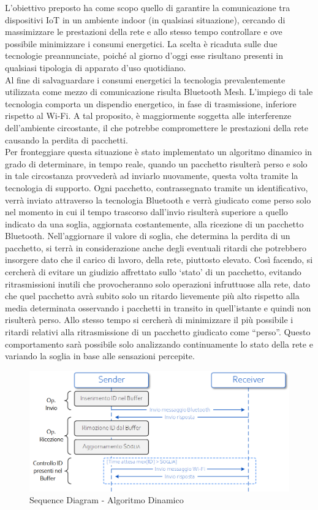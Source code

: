 \noindent L'obiettivo preposto ha come scopo quello di garantire la comunicazione tra dispositivi IoT in un ambiente indoor (in qualsiasi situazione), cercando di massimizzare le prestazioni della rete e allo stesso tempo controllare e ove possibile minimizzare i consumi energetici. La scelta è ricaduta sulle due tecnologie preannunciate, poiché al giorno d'oggi esse risultano presenti in qualsiasi tipologia di apparato d'uso quotidiano.\\
Al fine di salvaguardare i consumi energetici la tecnologia prevalentemente utilizzata come mezzo di comunicazione risulta Bluetooth Mesh. L'impiego di tale tecnologia comporta un dispendio energetico, in fase di trasmissione, inferiore rispetto al Wi-Fi. A tal proposito, è maggiormente soggetta alle interferenze dell'ambiente circostante, il che potrebbe compromettere le prestazioni della rete causando la perdita di pacchetti.\\
Per fronteggiare questa situazione è stato implementato un algoritmo dinamico in grado di determinare, in tempo reale, quando un pacchetto risulterà perso e solo in tale circostanza provvederà ad inviarlo nuovamente, questa volta tramite la tecnologia di supporto.
Ogni pacchetto, contrassegnato tramite un identificativo, verrà inviato attraverso la tecnologia Bluetooth e verrà giudicato come perso solo nel momento in cui il tempo trascorso dall'invio risulterà superiore a quello indicato da una soglia, aggiornata costantemente, alla ricezione di un pacchetto Bluetooth.
Nell'aggiornare il valore di soglia, che determina la perdita di un pacchetto, si terrà in considerazione anche degli eventuali ritardi che potrebbero insorgere dato che il carico di lavoro, della rete, piuttosto elevato. Così facendo, si cercherà di evitare un giudizio affrettato sullo `stato' di un pacchetto, evitando ritrasmissioni inutili che provocheranno solo operazioni infruttuose alla rete, dato che quel pacchetto avrà subito solo un ritardo lievemente più alto rispetto alla media determinata osservando i pacchetti in transito in quell'istante e quindi non risulterà perso. Allo stesso tempo si cercherà di minimizzare il più possibile i ritardi relativi alla ritrasmissione di un pacchetto giudicato come ``perso''. Questo comportamento sarà possibile solo analizzando continuamente lo stato della rete e variando la soglia in base alle sensazioni percepite.

\begin{figure}[!ht]
    \centering
    \includegraphics[width = \textwidth]{images/algoritmo_sequence.png}
    \caption{Sequence Diagram - Algoritmo Dinamico}
    \label{fig:sequence_algorithm}
\end{figure}

